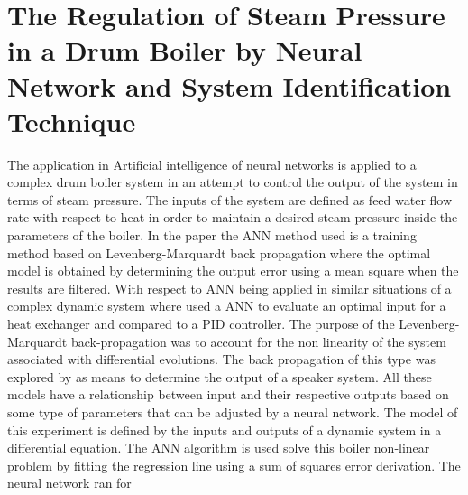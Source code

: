 \documentclass[12pt]{article} %
\begin{document}
\newpage


\section{The Regulation of Steam Pressure in a Drum Boiler by Neural Network and System Identification Technique} %
The application in Artificial intelligence of neural networks is applied to a complex drum boiler system in an attempt to control the output of the system in terms of steam pressure. The inputs of the system are defined as feed water flow rate with respect to heat in order to maintain a desired steam pressure inside the parameters of the boiler. In the paper the ANN method used is a training method based on Levenberg-Marquardt back propagation where the optimal model is obtained by determining the output error using a mean square when the results are filtered. With respect to ANN being applied in similar situations of a complex dynamic system where \cite{Vasickaninova} used a ANN to evaluate an optimal input for a heat exchanger and compared to a PID controller. The purpose of the Levenberg-Marquardt back-propagation was to account for the non linearity of the system associated with differential evolutions. The back propagation of this type was explored by \cite{wu} as means to determine the output of a speaker system. All these models have a relationship between input and their respective outputs based on some type of parameters that can be adjusted by a neural network. The model of this experiment is defined by the inputs and outputs of a dynamic system in a differential equation. The ANN algorithm is used solve this boiler non-linear problem by fitting the regression line using a sum of squares error derivation. The neural network ran for

\newpage
\end{document}

